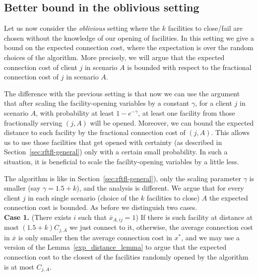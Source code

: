 \documentclass[11pt]{article}
\begin{document}
\subsection{Better bound in the oblivious setting}
\label{sec:rftfl-oblivious}
Let us now consider the \emph{oblivious} setting where the $k$ facilities to 
close/fail are chosen
without the knowledge of our opening of facilities. 
In this setting we give a bound on the expected connection cost, where the expectation is 
over the random choices of the algorithm. More precisely, we will argue that the expected
connection cost of client $j$ in scenario $A$ is bounded with respect to the fractional connection
cost of $j$ in scenario $A$. 

The difference with the previous setting is that now we can use the argument that after scaling the facility-opening variables
by a constant $\gamma$, for a client $j$ in scenario $A$, with probability at least $1-e^{-\gamma}$,
at least one facility from those fractionally serving $(j,A)$ will be opened. Moreover, we can bound
the expected distance to such facility by the fractional connection cost of $(j,A)$.
This allows us to use those facilities that get opened with certainty 
(as described in Section~\ref{sec:rftfl-general}) 
only with a certain small probability. 
In such a situation, it is beneficial to scale the 
facility-opening variables by a little less.

The algorithm is like in Section~\ref{sec:rftfl-general}),
only the scaling parameter $\gamma$ is smaller (say $\gamma=1.5+k$),
and the analysis is different. We argue that 
for every client $j$ in each single 
scenario (choice of the $k$ facilities to close) $A$ the expected
connection cost is bounded. As before we distinguish two cases.\\
{\bf Case 1.} (There exists $i$ such that $\overline{x}_{A,ij} = 1$)
If there is such facility at distance at most $(1.5+k) C_{j,A}$ we just connect to it,
otherwise, the average connection cost in $\overline{x}$ is only smaller then the average connection cost in $x^*$,
and we may use a version of the Lemma~\ref{exp_distance_lemma} to argue
that the expected connection cost to the closest of the facilities 
randomly opened by the algorithm is at most $C_{j,A}$.
\end{document}
